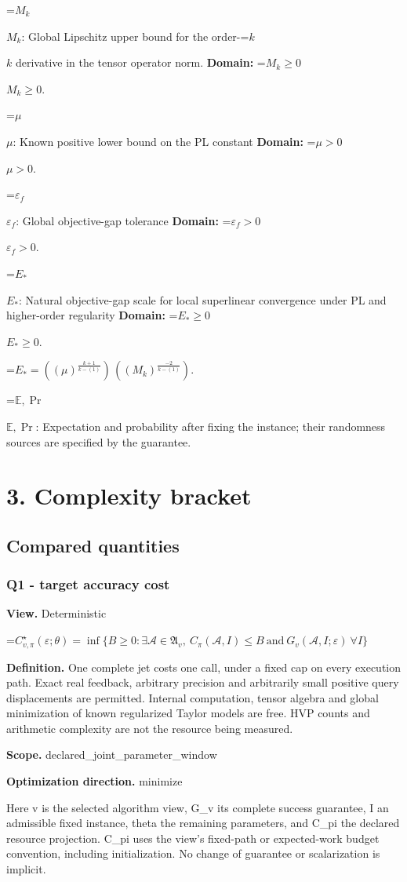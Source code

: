 \documentclass[10pt,a4paper]{article}
\newcommand{\AtlasMath}[1]{\par\begingroup\centering\setbox0=\hbox{$\displaystyle #1$}\ifdim\wd0>1.4\linewidth\typeout{ATLAS WIDE FORMULA: \the\wd0}\fi\ifdim\wd0>\linewidth\resizebox{\linewidth}{!}{\box0}\else\box0\fi\par\endgroup}
\newcommand{\AtlasInlineMath}[1]{\begingroup\setbox0=\hbox{$#1$}\ifdim\wd0>.4\linewidth\endgroup\AtlasMath{#1}\else\endgroup$#1$\fi}
\begin{document}
\AtlasInlineMath{M_k}: Global Lipschitz upper bound for the order-\AtlasInlineMath{k} derivative in the tensor operator norm. \textbf{Domain:} \AtlasInlineMath{M_k\ge0}.

\AtlasInlineMath{\mu}: Known positive lower bound on the PL constant \textbf{Domain:} \AtlasInlineMath{\mu>0}.

\AtlasInlineMath{\varepsilon_f}: Global objective-gap tolerance \textbf{Domain:} \AtlasInlineMath{\varepsilon_f>0}.

\AtlasInlineMath{E_*}: Natural objective-gap scale for local superlinear convergence under PL and higher-order regularity \textbf{Domain:} \AtlasInlineMath{E_*\ge0}.


\AtlasMath{E_*=((\mu)^{\frac{k+1}{k-(1)}})\,((M_k)^{\frac{-2}{k-(1)}}).}


\AtlasInlineMath{\mathbb{E},\Pr}: Expectation and probability after fixing the instance; their randomness sources are specified by the guarantee.

\section{3. Complexity bracket}
\subsection{Compared quantities}
\subsubsection{Q1 - target accuracy cost}
\textbf{View.} Deterministic

\AtlasMath{C^\star_{v,\pi}(\varepsilon;\theta)=\inf\{B\ge0:\exists\mathcal A\in\mathfrak A_v,\ C_\pi(\mathcal A,I)\le B\ \text{and}\ G_v(\mathcal A,I;\varepsilon)\ \forall I\}}
\textbf{Definition.} One complete jet costs one call, under a fixed cap on every execution path. Exact real feedback, arbitrary precision and arbitrarily small positive query displacements are permitted. Internal computation, tensor algebra and global minimization of known regularized Taylor models are free. HVP counts and arithmetic complexity are not the resource being measured.

\textbf{Scope.} declared\_joint\_parameter\_window

\textbf{Optimization direction.} minimize

Here v is the selected algorithm view, G\_v its complete success guarantee, I an admissible fixed instance, theta the remaining parameters, and C\_pi the declared resource projection. C\_pi uses the view's fixed-path or expected-work budget convention, including initialization. No change of guarantee or scalarization is implicit.
\end{document}
